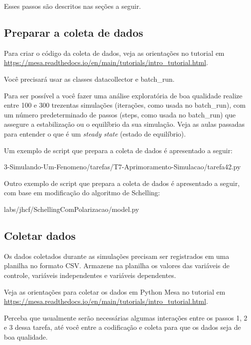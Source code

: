 Esses passos são descritos nas seções a seguir.

\subsection{Preparar a coleta de dados}

Para criar o código da coleta de dados, veja as orientações no tutorial em \url{https://mesa.readthedocs.io/en/main/tutorials/intro_tutorial.html}.

Você precisará usar as classes datacollector e batch\_run.

Para ser possível a você fazer uma análise exploratória de boa qualidade realize entre 100 e 300 trezentas simulações (iterações, como usada no batch\_run), com um número predeterminado de passos (steps, como usada no batch\_run) que assegure a estabilização ou o equilíbrio da sua simulação. Veja as aulas passadas para entender o que é um \textit{steady state} (estado de equilíbrio).

Um exemplo de script que prepara a coleta de dados é apresentado a seguir:

 {3-Simulando-Um-Fenomeno/tarefas/T7-Aprimoramento-Simulacao/tarefa42.py}

Outro exemplo de script que prepara a coleta de dados é apresentado a seguir, com
base em modificação do algoritmo de Schelling:

 {labs/jhcf/SchellingComPolarizacao/model.py}


\subsection{Coletar dados}

Os dados coletados durante as simulações precisam ser registrados em uma planilha no formato CSV. Armazene na planilha os valores das variáveis de controle, variáveis independentes e variáveis dependentes.

Veja as orientações para coletar os dados em Python Mesa no tutorial em \url{https://mesa.readthedocs.io/en/main/tutorials/intro_tutorial.html}.

Perceba que usualmente serão necessárias algumas interações entre os passos 1, 2 e 3 dessa tarefa, até você entre a codificação e coleta para que os dados seja de boa qualidade.

